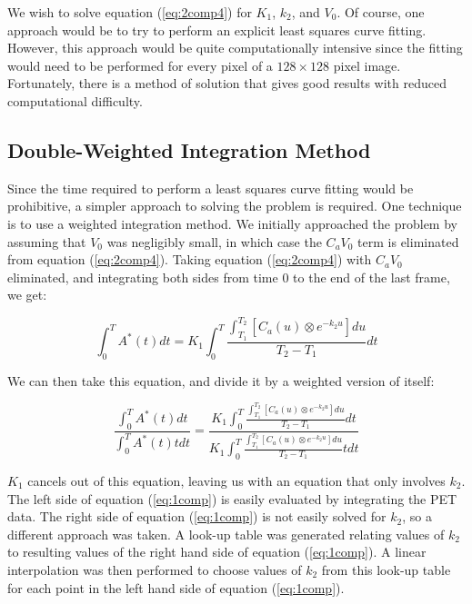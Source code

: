 We wish to solve equation (\ref{eq:2comp4}) for $K_{1}$, $k_{2}$, and
$V_{0}$.  Of course, one approach would be to try to perform an
explicit least squares curve fitting.  However, this approach would be
quite computationally intensive since the fitting would need to be
performed for every pixel of a $128 \times 128$ pixel image.  Fortunately,
there is a method of solution that gives good results with reduced
computational difficulty.

\subsection{Double-Weighted Integration Method}

\label{sec:double_weight}

Since the time required to perform a least squares curve fitting would
be prohibitive, a simpler approach to solving the problem is required.
One technique is to use a weighted integration method.  We initially
approached the problem by assuming that $V_{0}$ was negligibly small,
in which case the $C_{a}V_{0}$ term is eliminated from equation
(\ref{eq:2comp4}).  Taking equation (\ref{eq:2comp4}) with $C_{a}V_0$
eliminated, and integrating both sides from time 0 to the end of the
last frame, we get:

\begin{equation}
\int_{0}^{T} A^{*}(t) dt = K_{1} \int_{0}^{T} \frac{\int_{T_1}^{T_2}
\left[ C_{a}(u) \otimes e^{-k_{2}u} \right] du}{T_2 - T_1} dt
\end{equation}

We can then take this equation, and divide it by a weighted version
of itself:

\begin{equation}
\frac{\int_{0}^{T} A^{*}(t) dt}{\int_{0}^{T} A^{*}(t) t dt} =
\frac{K_{1} \int_{0}^{T} \frac{\int_{T_1}^{T_2} \left[ C_{a}(u)
\otimes e^{-k_{2}u} \right] du}{T_2 - T_1} dt}{K_{1} \int_{0}^{T}
\frac{\int_{T_1}^{T_2} \left[ C_{a}(u) \otimes e^{-k_{2}u} \right]
du}{T_2 - T_1} t dt}
\label{eq:1comp}
\end{equation}

$K_{1}$ cancels out of this equation, leaving us with an equation
that only involves $k_{2}$.  The left side of equation
(\ref{eq:1comp}) is easily evaluated by integrating the PET data.
The right side of equation (\ref{eq:1comp}) is not easily solved for
$k_{2}$, so a different approach was taken.  A look-up table was
generated relating values of $k_{2}$ to resulting values of the
right hand side of equation (\ref{eq:1comp}).  A linear
interpolation was then performed to choose values of $k_{2}$ from
this look-up table for each point in the left hand side of equation
(\ref{eq:1comp}).


